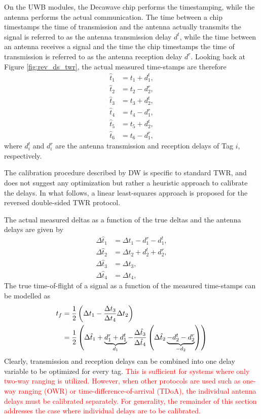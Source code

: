 \documentclass{decar-wsd}    %
\begin{document}
On the UWB modules, the Decawave chip performs the timestamping, while the antenna performs the actual communication. The time between a chip timestamps the time of transmission and the antenna actually transmits the signal is referred to as the antenna transmission delay $d^t$, while the time between an antenna receives a signal and the time the chip timestamps the time of transmission is referred to as the antenna reception delay $d^r$. Looking back at Figure \ref{fig:rev_ds_twr}, the actual measured time-stamps are therefore
\begin{align}
    \hat{t}_1 &= t_1 + d_1^t, \\
    \hat{t}_2 &= t_2 - d_2^r, \\
    \hat{t}_3 &= t_3 + d_2^t, \\
    \hat{t}_4 &= t_4 - d_1^r, \\ 
    \hat{t}_5 &= t_5 + d_2^t, \\
    \hat{t}_6 &= t_6 - d_1^r,
\end{align}
where $d_i^t$ and $d_i^r$ are the antenna transmission and reception delays of Tag $i$, respectively.

The calibration procedure described by DW is specific to standard TWR, and does not suggest any optimization but rather a heuristic approach to calibrate the delays. In what follows, a linear least-squares approach is proposed for the reversed double-sided TWR protocol.

The actual measured deltas as a function of the true deltas and the antenna delays are given by
\begin{align}
    \Delta \hat{t}_1 &= \Delta t_1 - d_1^r - d_1^t, \\
    \Delta \hat{t}_2 &= \Delta t_2 + d_2^t + d_2^r, \\
    \Delta \hat{t}_3 &= \Delta t_3, \\
    \Delta \hat{t}_4 &= \Delta t_4,
\end{align}
The true time-of-flight of a signal as a function of the measured time-stamps can be modelled as
\begin{align}
    t_f &= \frac{1}{2} \left( \Delta {t}_1 - \frac{ \Delta {t}_3}{\Delta {t}_4} \Delta {t}_2 \right) \\
    &= \frac{1}{2} \left( \Delta \hat{t}_1 + \underbrace{ d_1^r + d_1^t}_{d_1} - \frac{ \Delta \hat{t}_3}{\Delta \hat{t}_4} \left( \Delta \hat{t}_2  \underbrace{ - d_2^t - d_2^r}_{-d_2} \right) \right) \label{eq:tof_with_delays}
\end{align}
Clearly, transmission and reception delays can be combined into one delay variable to be optimized for every tag. \textcolor{red}{This is sufficient for systems where only two-way ranging is utilized. However, when other protocols are used such as one-way ranging (OWR) or time-difference-of-arrival (TDoA), the individual antenna delays must be calibrated separately. For generality, the remainder of this section addresses the case where individual delays are to be calibrated.}
\end{document}
